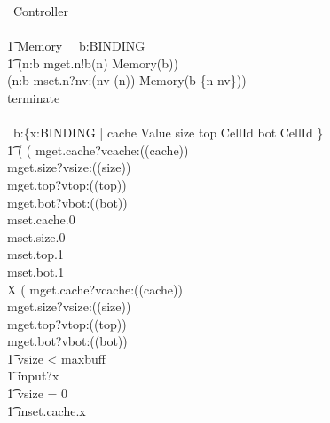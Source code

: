 \documentclass{llncs}
\begin{document}
\begin{circus}
    \circprocess\ Controller \circdef \\
    \circbegin\ \\
    \t1
        Memory \circdef\
                \circvres\ b:BINDING \circspot \\
            \t1 (\ExtChoice n:\dom b \circspot mget.n!b(n) \then Memory(b)) \\
                \extchoice (\ExtChoice n:\dom b \circspot mset.n?nv:(nv \in \delta(n)) \then Memory(b \oplus \{n \mapsto nv\}))\\
                \extchoice terminate \then \Skip \\
                    \\
        \circspot
                \circvar\ b:\{x:BINDING | cache \in Value \land size \in \nat \land top \in CellId \land bot \in CellId \} \circspot \\
            \t1
            (
                (
                    mget.cache?vcache:(\delta(cache)) \then \\
                    mget.size?vsize:(\delta(size)) \then \\
                    mget.top?vtop:(\delta(top)) \then \\
                    mget.bot?vbot:(\delta(bot)) \then \\
                    mset.cache.0 \then \\
                    mset.size.0 \then \\
                    mset.top.1 \then \\
                    mset.bot.1 \then \\
                    \circmu X \circspot
                    (
                        mget.cache?vcache:(\delta(cache)) \then \\
                        mget.size?vsize:(\delta(size)) \then \\
                        mget.top?vtop:(\delta(top)) \then \\
                        mget.bot?vbot:(\delta(bot)) \then \\
                        \t1 \lcircguard vsize < maxbuff \rcircguard \circguard \\
                            \t1 input?x \then \\
                                \t1 \lcircguard vsize = 0 \rcircguard \circguard \\
                                    \t1 mset.cache.x \then \\

\end{circus}
\end{document}
